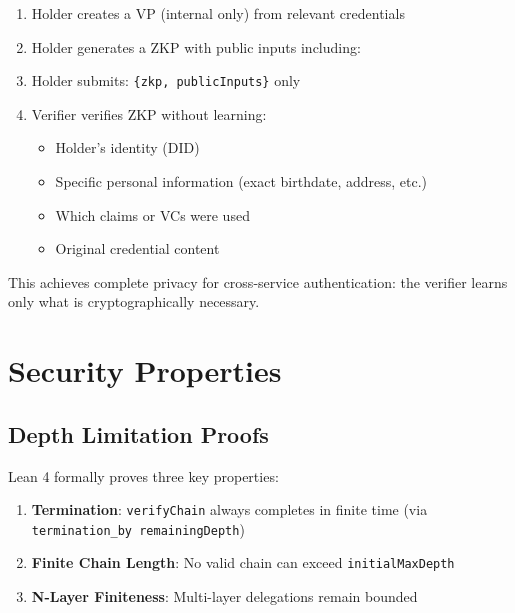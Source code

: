 \begin{enumerate}
  \item Holder creates a VP (internal only) from relevant credentials
  \item Holder generates a ZKP with public inputs including:
  \item Holder submits: \texttt{\{zkp, publicInputs\}} only
  \item Verifier verifies ZKP without learning:
    \begin{itemize}
      \item Holder's identity (DID)
      \item Specific personal information (exact birthdate, address, etc.)
      \item Which claims or VCs were used
      \item Original credential content
    \end{itemize}
\end{enumerate}

This achieves complete privacy for cross-service authentication: the verifier learns only what is cryptographically necessary.

\section{Security Properties}

\subsection{Depth Limitation Proofs}

Lean 4 formally proves three key properties:

\begin{enumerate}
  \item \textbf{Termination}: \texttt{verifyChain} always completes in finite time (via \texttt{termination\_by remainingDepth})
  \item \textbf{Finite Chain Length}: No valid chain can exceed \texttt{initialMaxDepth}
  \item \textbf{N-Layer Finiteness}: Multi-layer delegations remain bounded
\end{enumerate}

